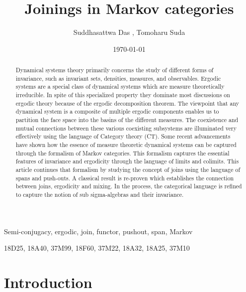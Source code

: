 \documentclass[12pt,oneside,pb-diagram]{article}
\title{Joinings in Markov categories}
\begin{document}
\author{ Suddhasattwa Das \footnotemark[1], Tomoharu Suda \footnotemark[2] \footnotemark[3]}
\date{\today}
\maketitle
\begin{abstract}
	Dynamical systems theory primarily concerns the study of different forms of invariance, such as invariant sets, densities, measures, and observables. Ergodic systems are a special class of dynamical systems which are measure theoretically irreducible. In spite of this specialized property they dominate most discussions on ergodic theory because of the ergodic decomposition theorem. The viewpoint that any dynamical system is a composite of multiple ergodic components enables us to partition the face space into the basins of the different measures. The coexistence and mutual connections between these various coexisting subsystems are illuminated very effectively using the language of Category theory (CT). Some recent advancements have shown how the essence of measure theoretic dynamical systems can be captured through the formalism of Markov categories. This formalism captures the essential features of invariance and ergodicity through the language of limits and colimits.  This article continues that formalism by studying the concept of joins using the language of spans and push-outs. A classical result is re-proven which establishes the connection between joins, ergodicity and mixing. In the process, the categorical language is refined to capture the notion of sub sigma-algebras and  their invariance.
\end{abstract}

\begin{keywords} Semi-conjugacy, ergodic, join, functor, pushout, span, Markov \end{keywords}

\begin{AMS}	18D25, 18A40, 37M99, 18F60, 37M22, 18A32, 18A25, 37M10 \end{AMS}
\section{Introduction} \label{sec:intro}
\end{document}
